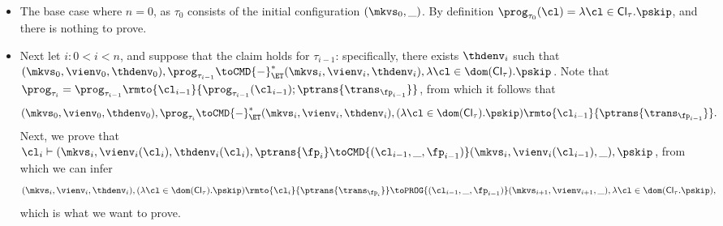 \begin{itemize}
\item The base case where  $n = 0$, as $\tau_{0}$ consists of the initial configuration $(\mkvs_{0}, \_)$. 
By definition $\prog_{\tau_{0}}(\cl) = \lambda \cl \in \mathsf{Cl}_{\tau}.\pskip$, and there is nothing to prove.

\item Next let $i: 0 < i < n$, and suppose that the claim holds for $\tau_{i-1}$: specifically, there exists 
$\thdenv_{i}$ such that $(\mkvs_{0}, \vienv_{0}, \thdenv_{0}), \prog_{\tau_{i-1}} \toCMD{-}^{\ast}_{\ET} 
(\mkvs_{i}, \vienv_{i}, \thdenv_{i}), \lambda \cl \in \dom(\mathsf{Cl}_{\tau}).\pskip$. Note that 
$\prog_{\tau_{i}} = \prog_{\tau_{i-1}}\rmto{\cl_{i-1}}{\prog_{\tau_{i-1}}(\cl_{i-1}) ; \ptrans{\trans_{\fp_{i-1}}}}$, 
from which it follows that 
\[
(\mkvs_{0}, \vienv_{0}, \thdenv_{0}), \prog_{\tau_{i}} \toCMD{-}^{\ast}_{\ET} 
(\mkvs_{i}, \vienv_{i}, \thdenv_{i}), (\lambda \cl \in \dom(\mathsf{Cl}_{\tau}).\pskip)\rmto{\cl_{i-1}}{\ptrans{\trans_{\fp_{i-1}}}}.
\]
Next, we prove that $\cl_{i} \vdash (\mkvs_i, \vienv_{i}(\cl_{i}), \thdenv_{i}(\cl_{i}), \ptrans{\fp_{i}} 
\toCMD{(\cl_{i-1}, \_, \fp_{i-1})} (\mkvs_{i}, \vienv_{i}(\cl_{i-1}), \_), \pskip$, 
from which we can infer 
\[
(\mkvs_{i}, \vienv_{i}, \thdenv_{i}), (\lambda \cl \in \dom(\mathsf{Cl}_{\tau}).\pskip)\rmto{\cl_{i}}{\ptrans{\trans_{\fp_{i}}}} 
\toPROG{(\cl_{i-1}, \_, \fp_{i-1})} (\mkvs_{i+1}, \vienv_{i+1}, \_), \lambda \cl \in \dom(\mathsf{Cl}_{\tau}.\pskip),
\]
which is what we want to prove. 


\end{itemize}
